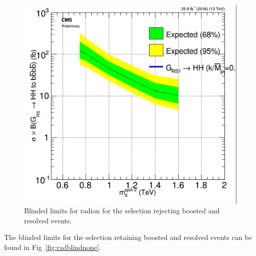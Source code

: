\begin{figure}[thb!]
\begin{center}
\includegraphics[scale=0.5]{Figures/brazflag_Rad_both_v2.pdf}
\end{center}
\caption{Blinded limits for radion for the selection rejecting boosted and resolved events.}
\label{fig:radblindboth}
\end{figure} 

The blinded limits for the selection retaining boosted and resolved events can be found in Fig~\ref{fig:radblindnone}.

